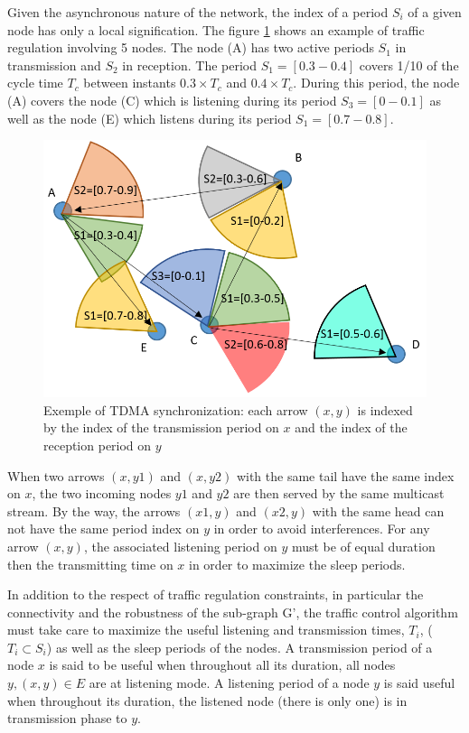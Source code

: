 \documentclass[letterpaper, 10 pt, conference]{ieeeconf}
\begin{document}
Given the asynchronous nature of the network, the index of a period $ S_i $ of a given node has only a local signification. The figure \ref{trafficregulation} shows an example of traffic regulation involving 5 nodes. The node (A) has two active periods $S_1$ in transmission and $S_2$ in reception. The period $ S_1 = [0.3-0.4] $ covers 1/10 of the cycle time $ T_{c} $ between instants $ 0.3 \times T_{c} $ and $ 0.4 \times T_{c} $. During this period, the node (A) covers the node (C) which is listening during its period $ S_3 = [0-0.1] $ as well as the node (E) which listens during its period $ S_1 = [0.7-0.8] $. 

\begin{figure}[h]
\centering
\includegraphics[width=\columnwidth]{trafficregulation.png}
\caption{Exemple of TDMA synchronization: each arrow $(x,y)$ is indexed by the index of the transmission period on $x$ and the index of the reception period on $y$ }
\label{trafficregulation}
\end{figure}

When two arrows $ (x, y1) $ and $ (x, y2) $ with the same tail have the same index on $ x $, the two incoming nodes $ y1 $ and $ y2 $ are then served by the same multicast stream. By the way, the arrows $ (x1, y) $ and $ (x2, y) $ with the same head can not have the same period index on $ y $ in order to avoid interferences. For any arrow $ (x, y) $, the associated listening period on $ y $ must be of equal duration then the transmitting time on $ x $ in order to maximize the sleep periods. 

In addition to the respect of traffic regulation constraints, in particular the connectivity and the robustness of the sub-graph G', the traffic control algorithm must take care to maximize the useful listening and transmission times, $ T_i $, ($ T_i \subset S_i $) as well as the sleep periods of the nodes. A transmission period of a node $ x $ is said to be useful when throughout all its duration, all nodes $ y, (x, y) \in E $ are at listening mode. A listening period of a node $ y $ is said useful when throughout its duration, the listened node (there is only one) is in transmission phase to $ y $.
\end{document}
